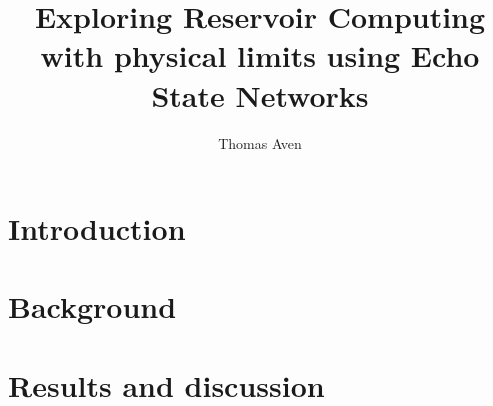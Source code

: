 \documentclass[journal]{IEEEtran}
\begin{document}
\title{Exploring Reservoir Computing with physical limits using Echo State Networks}
\author{Thomas Aven}
\date{}
\maketitle



\section{Introduction}


\section{Background}


\section{Results and discussion}





\end{document}
